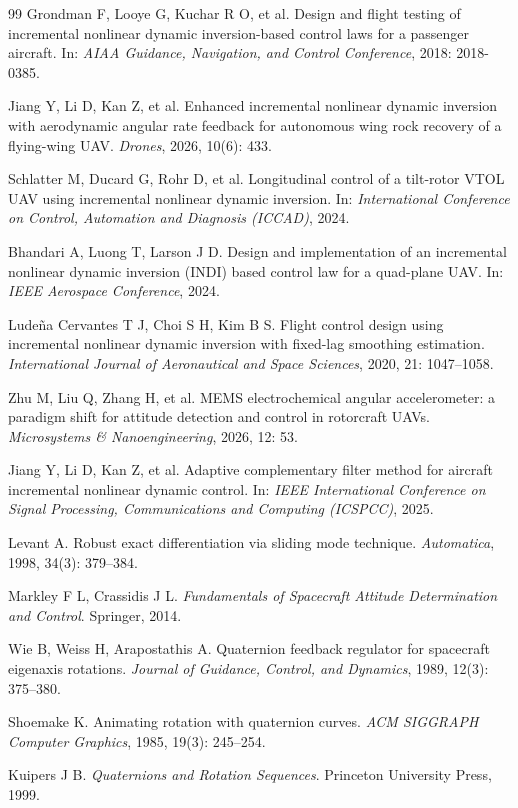 \begin{thebibliography}{99}
Grondman F, Looye G, Kuchar R O, et al.
Design and flight testing of incremental nonlinear dynamic inversion-based control laws for a passenger aircraft.
In: \textit{AIAA Guidance, Navigation, and Control Conference}, 2018: 2018-0385.

Jiang Y, Li D, Kan Z, et al.
Enhanced incremental nonlinear dynamic inversion with aerodynamic angular rate feedback for autonomous wing rock recovery of a flying-wing UAV.
\textit{Drones}, 2026, 10(6): 433.

Schlatter M, Ducard G, Rohr D, et al.
Longitudinal control of a tilt-rotor VTOL UAV using incremental nonlinear dynamic inversion.
In: \textit{International Conference on Control, Automation and Diagnosis (ICCAD)}, 2024.

Bhandari A, Luong T, Larson J D.
Design and implementation of an incremental nonlinear dynamic inversion (INDI) based control law for a quad-plane UAV.
In: \textit{IEEE Aerospace Conference}, 2024.

Lude\~{n}a Cervantes T J, Choi S H, Kim B S.
Flight control design using incremental nonlinear dynamic inversion with fixed-lag smoothing estimation.
\textit{International Journal of Aeronautical and Space Sciences}, 2020, 21: 1047--1058.

Zhu M, Liu Q, Zhang H, et al.
MEMS electrochemical angular accelerometer: a paradigm shift for attitude detection and control in rotorcraft UAVs.
\textit{Microsystems \& Nanoengineering}, 2026, 12: 53.

Jiang Y, Li D, Kan Z, et al.
Adaptive complementary filter method for aircraft incremental nonlinear dynamic control.
In: \textit{IEEE International Conference on Signal Processing, Communications and Computing (ICSPCC)}, 2025.

Levant A.
Robust exact differentiation via sliding mode technique.
\textit{Automatica}, 1998, 34(3): 379--384.

Markley F L, Crassidis J L.
\textit{Fundamentals of Spacecraft Attitude Determination and Control}.
Springer, 2014.

Wie B, Weiss H, Arapostathis A.
Quaternion feedback regulator for spacecraft eigenaxis rotations.
\textit{Journal of Guidance, Control, and Dynamics}, 1989, 12(3): 375--380.

Shoemake K.
Animating rotation with quaternion curves.
\textit{ACM SIGGRAPH Computer Graphics}, 1985, 19(3): 245--254.

Kuipers J B.
\textit{Quaternions and Rotation Sequences}.
Princeton University Press, 1999.

\end{thebibliography}
